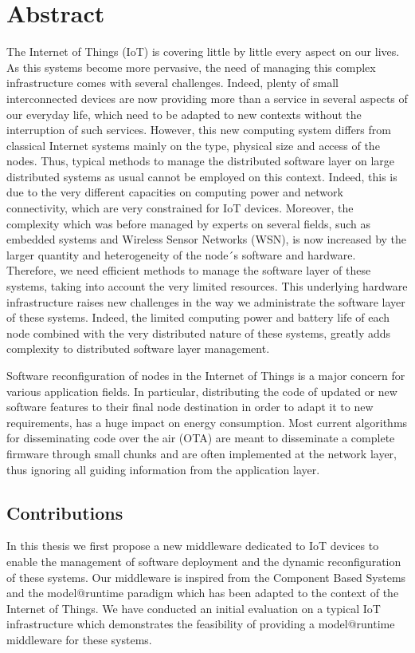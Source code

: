 \chapter*{Abstract}
The Internet of Things (IoT) is covering little by little every aspect on our lives.
As this systems become more pervasive, the need of managing this complex infrastructure comes with several challenges.
Indeed, plenty of small interconnected devices are now providing more than a service in several aspects of our everyday life, which need to be adapted to new contexts without the interruption of such services.
However, this new computing system differs from classical Internet systems mainly on the type, physical size and access of the nodes.
Thus, typical methods to manage the distributed software layer on large distributed systems as usual cannot be employed on this context.
Indeed, this is due to the very different capacities on computing power and network connectivity, which are very constrained for IoT devices.
Moreover, the complexity which was before managed by experts on several fields, such as embedded systems and Wireless Sensor Networks (WSN), is now increased by the larger quantity and heterogeneity of the node´s software and hardware.
Therefore, we need efficient methods to manage the software layer of these systems, taking into account the very limited resources.
This underlying hardware infrastructure raises new challenges in the way we administrate the software layer of these systems.
Indeed, the limited computing power and battery life of each node combined with the very distributed nature of these systems, greatly adds complexity to distributed software layer management.

Software reconfiguration of nodes in the Internet of Things is a major concern for various application fields.
In particular, distributing the code of updated or new software features to their final node destination in order to adapt it to new requirements, has a huge impact on energy consumption.
Most current algorithms for disseminating code over the air (OTA) are meant to disseminate a complete firmware through small chunks  and are often implemented at the network layer, thus ignoring all guiding information from the application layer.

\section*{Contributions}
In this thesis we first propose a new middleware dedicated to IoT devices to enable the management of software deployment and the dynamic reconfiguration of these systems.
Our middleware is inspired from the Component Based Systems and the model@runtime paradigm which has been adapted to the context of the Internet of Things.
We have conducted an initial evaluation on a typical IoT infrastructure which demonstrates the feasibility of providing a model@runtime middleware for these systems.

